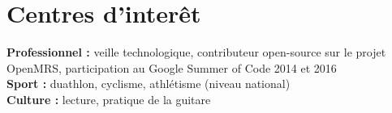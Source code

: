 \documentclass[]{cv-style}          %
\begin{document}
\section{Centres d'interêt}
  \vspace{-0.2cm}
  
\textbf{Professionnel :} veille technologique,  contributeur open-source sur le projet OpenMRS, participation au Google Summer of Code 2014 et 2016 \\
\textbf{Sport :} duathlon, cyclisme, athlétisme (niveau national) \\
\textbf{Culture :} lecture, pratique de la guitare
\end{document}
